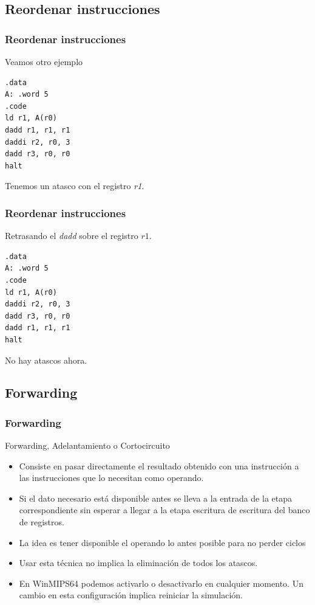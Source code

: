\documentclass{beamer}
\begin{document}
\subsection{Reordenar instrucciones}
\begin{frame}[fragile]
\frametitle{Reordenar instrucciones}

Veamos otro ejemplo
\begin{block}{}
\begin{lstlisting}[basicstyle=\ttfamily,keywordstyle=\color{blue}]
.data
A: .word 5
.code
ld r1, A(r0)
dadd r1, r1, r1
daddi r2, r0, 3
dadd r3, r0, r0
halt
\end{lstlisting}
\end{block}
Tenemos un atasco con el registro \emph{r1}.

\end{frame}


\begin{frame}[fragile]
\frametitle{Reordenar instrucciones}
Retrasando el \emph{dadd} sobre el registro $r1$.
\begin{block}{}
\begin{lstlisting}[basicstyle=\ttfamily,keywordstyle=\color{blue}]
.data
A: .word 5
.code
ld r1, A(r0)
daddi r2, r0, 3
dadd r3, r0, r0
dadd r1, r1, r1
halt
\end{lstlisting}
\end{block}
No hay atascos ahora.
\end{frame}



\subsection{Forwarding}

\begin{frame}[fragile]
\frametitle{Forwarding}
Forwarding, Adelantamiento o Cortocircuito
\begin{itemize}
\item Consiste en pasar directamente el resultado obtenido con una instrucción a las instrucciones que lo necesitan como operando.
\item Si el dato necesario está disponible antes se lleva a la entrada de la etapa correspondiente sin esperar a llegar a la etapa escritura de escritura del banco de registros.
\item La idea es tener disponible el operando lo antes posible para no perder ciclos
\item Usar esta técnica no implica la eliminación de todos los atascos.
\item En WinMIPS64 podemos activarlo o desactivarlo en cualquier momento. Un cambio en esta configuración implica reiniciar la simulación.
\end{itemize}
\end{frame}
\end{document}
